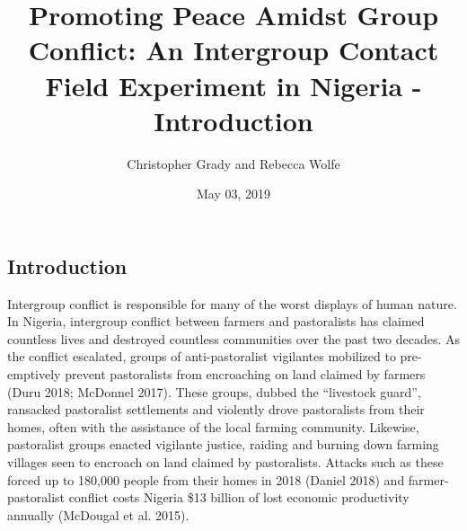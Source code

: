 \documentclass[11pt]{article}
\title{Promoting Peace Amidst Group Conflict: An Intergroup Contact Field
Experiment in Nigeria - Introduction}
\author{
Christopher Grady and Rebecca Wolfe
}
\date{May 03, 2019}
\begin{document}
\VerbatimFootnotes

%
%
%
%
%
%
%
%
%
%

\maketitle

\subsection{Introduction}\label{introduction}

Intergroup conflict is responsible for many of the worst displays of
human nature. In Nigeria, intergroup conflict between farmers and
pastoralists has claimed countless lives and destroyed countless
communities over the past two decades. As the conflict escalated, groups
of anti-pastoralist vigilantes mobilized to pre-emptively prevent
pastoralists from encroaching on land claimed by farmers (Duru 2018;
McDonnel 2017). These groups, dubbed the ``livestock guard'', ransacked
pastoralist settlements and violently drove pastoralists from their
homes, often with the assistance of the local farming community.
Likewise, pastoralist groups enacted vigilante justice, raiding and
burning down farming villages seen to encroach on land claimed by
pastoralists. Attacks such as these forced up to 180,000 people from
their homes in 2018 (Daniel 2018) and farmer-pastoralist conflict costs
Nigeria \$13 billion of lost economic productivity annually (McDougal et
al. 2015).
\end{document}
